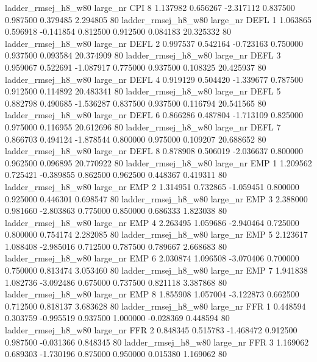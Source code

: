 ladder_rmsej_h8_w80   large_nr      CPI                 8  1.137982  0.656267  -2.317112 0.837500 0.987500  0.379485    2.294805 80
ladder_rmsej_h8_w80   large_nr     DEFL                 1  1.063865  0.596918  -0.141854 0.812500 0.912500  0.084183   20.325332 80
ladder_rmsej_h8_w80   large_nr     DEFL                 2  0.997537  0.542164  -0.723163 0.750000 0.937500  0.093584   20.374909 80
ladder_rmsej_h8_w80   large_nr     DEFL                 3  0.959067  0.522691  -1.087917 0.775000 0.937500  0.108325   20.425937 80
ladder_rmsej_h8_w80   large_nr     DEFL                 4  0.919129  0.504420  -1.339677 0.787500 0.912500  0.114892   20.483341 80
ladder_rmsej_h8_w80   large_nr     DEFL                 5  0.882798  0.490685  -1.536287 0.837500 0.937500  0.116794   20.541565 80
ladder_rmsej_h8_w80   large_nr     DEFL                 6  0.866286  0.487804  -1.713109 0.825000 0.975000  0.116955   20.612696 80
ladder_rmsej_h8_w80   large_nr     DEFL                 7  0.866703  0.494124  -1.878544 0.800000 0.975000  0.109207   20.688652 80
ladder_rmsej_h8_w80   large_nr     DEFL                 8  0.878908  0.506019  -2.036637 0.800000 0.962500  0.096895   20.770922 80
ladder_rmsej_h8_w80   large_nr      EMP                 1  1.209562  0.725421  -0.389855 0.862500 0.962500  0.448367    0.419311 80
ladder_rmsej_h8_w80   large_nr      EMP                 2  1.314951  0.732865  -1.059451 0.800000 0.925000  0.446301    0.698547 80
ladder_rmsej_h8_w80   large_nr      EMP                 3  2.388000  0.981660  -2.803863 0.775000 0.850000  0.686333    1.823038 80
ladder_rmsej_h8_w80   large_nr      EMP                 4  2.263495  1.059686  -2.940464 0.725000 0.800000  0.754174    2.282085 80
ladder_rmsej_h8_w80   large_nr      EMP                 5  2.123617  1.088408  -2.985016 0.712500 0.787500  0.789667    2.668683 80
ladder_rmsej_h8_w80   large_nr      EMP                 6  2.030874  1.096508  -3.070406 0.700000 0.750000  0.813474    3.053460 80
ladder_rmsej_h8_w80   large_nr      EMP                 7  1.941838  1.082736  -3.092486 0.675000 0.737500  0.821118    3.387868 80
ladder_rmsej_h8_w80   large_nr      EMP                 8  1.855908  1.057004  -3.122873 0.662500 0.712500  0.818137    3.683628 80
ladder_rmsej_h8_w80   large_nr      FFR                 1  0.448594  0.303759  -0.995519 0.937500 1.000000 -0.028369    0.448594 80
ladder_rmsej_h8_w80   large_nr      FFR                 2  0.848345  0.515783  -1.468472 0.912500 0.987500 -0.031366    0.848345 80
ladder_rmsej_h8_w80   large_nr      FFR                 3  1.169062  0.689303  -1.730196 0.875000 0.950000  0.015380    1.169062 80
